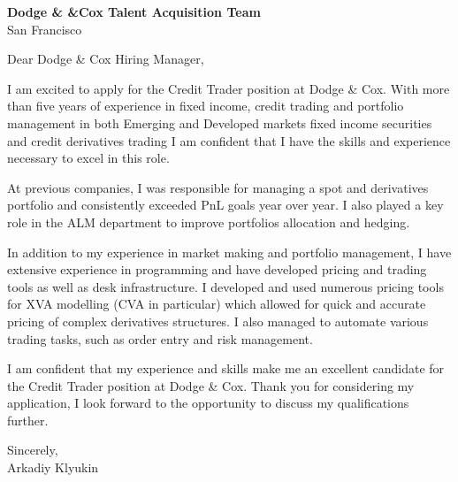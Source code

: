 \documentclass{letter}
\begin{document}
\begin{letter}{\textbf{Dodge \& &Cox Talent Acquisition Team} \\
                San Francisco}


\opening{Dear Dodge \& Cox Hiring Manager,}

I am excited to apply for the Credit Trader position at Dodge \& Cox. With more than five years of experience in fixed income, credit trading and portfolio management in both Emerging and Developed markets fixed income securities and credit derivatives trading I am confident that I have the skills and experience necessary to excel in this role.

At previous companies, I was responsible for managing a spot and derivatives portfolio and consistently exceeded PnL goals year over year. I also played a key role in the ALM department to improve portfolios allocation and hedging.

In addition to my experience in market making and portfolio management, I have extensive experience in programming and have developed pricing and trading tools as well as desk infrastructure. I developed and used numerous pricing tools for XVA modelling (CVA in particular) which allowed for quick and accurate pricing of complex derivatives structures. I also managed to automate various trading tasks, such as order entry and risk management.

I am confident that my experience and skills make me an excellent candidate for the Credit Trader position at Dodge \& Cox. Thank you for considering my application, I look forward to the opportunity to discuss my qualifications further.

Sincerely,\\
Arkadiy Klyukin
\end{letter}
\end{document}
